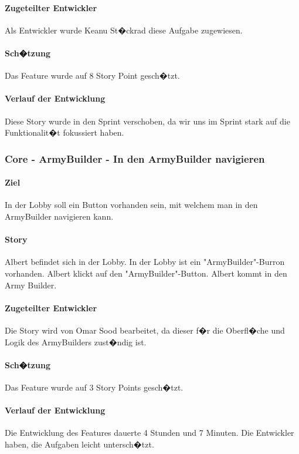 \documentclass[12pt, titlepage]{scrartcl}
\newcommand{\RN}[1]{%
	\textup{\uppercase\expandafter{\romannumeral#1}}%
}
\begin{document}
		\paragraph{Zugeteilter Entwickler} Als Entwickler wurde Keanu St�ckrad diese Aufgabe zugewiesen.
		\paragraph{Sch�tzung}
		Das Feature wurde auf 8 Story Point gesch�tzt.
		\paragraph{Verlauf der Entwicklung} 
		Diese Story wurde in den Sprint \RN{4} verschoben, da wir uns im Sprint \RN{3} stark auf die Funktionalit�t fokussiert haben. 
		
		\subsubsection{Core - ArmyBuilder - In den ArmyBuilder navigieren}
		\paragraph{Ziel} In der Lobby soll ein Button vorhanden sein, mit welchem man in den ArmyBuilder navigieren kann.
		\paragraph{Story} Albert befindet sich in der Lobby. In der Lobby ist ein "ArmyBuilder"-Burron vorhanden. Albert klickt auf den "ArmyBuilder"-Button. Albert kommt in den Army Builder.
		\paragraph{Zugeteilter Entwickler} Die Story wird von Omar Sood bearbeitet, da dieser f�r die Oberfl�che und Logik des ArmyBuilders zust�ndig ist.
		\paragraph{Sch�tzung}
		Das Feature wurde auf 3 Story Points gesch�tzt.
		\paragraph{Verlauf der Entwicklung} 
		Die Entwicklung des Features dauerte 4 Stunden und 7 Minuten. Die Entwickler haben, die Aufgaben leicht untersch�tzt.
		
\end{document}
